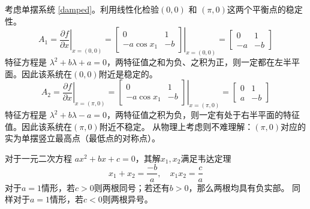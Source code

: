   \begin{example}[通过平衡点附近的线性化判别单摆系统的稳定性]\label{linearization_exp}
   考虑单摆系统 \eqref{damped}。利用线性化检验$(0, 0)$ 和 $(\pi, 0)$这两个平衡点的稳定性。
    \[ A_1 = \left. \frac{\partial f}{\partial x} \right|_{x = (0, 0)} = \left.
       \left[\begin{array}{cc}
         0 & 1\\
         -a\ensuremath{\operatorname{cos}}  x_1 & - b
       \end{array}\right] \right|_{x = (0, 0)} = \left[\begin{array}{cc}
         0 & 1\\
         - a & - b
       \end{array}\right] \]
    特征方程是 $\lambda^2 + b \lambda + a = 0$，两特征值之和为负、之积为正，则一定都在左半平面。因此该系统在$(0, 0)$附近是稳定的。
    \[ A_2 = \left. \frac{\partial f}{\partial x} \right|_{x = (\pi, 0)} =
       \left. \left[\begin{array}{cc}
         0 & 1\\
         -a\ensuremath{\operatorname{cos}}  x_1 & - b
       \end{array}\right] \right|_{x = (\pi, 0)} = \left[\begin{array}{cc}
         0 & 1\\
         a & - b
       \end{array}\right] \]
       特征方程是 $\lambda^2 + b \lambda - a = 0$，两特征值之积为负，则一定有处于右半平面的特征值。因此该系统在$(\pi, 0)$附近不稳定。
      从物理上考虑则不难理解：$(\pi, 0)$对应的实为单摆竖立最高点（最低点的对称点）。
    \begin{note}
      对于一元二次方程 $a  x^2 + b  x + c = 0$，其解$x_{1},x_{2}$满足韦达定理
      \[ x_1 + x_2 = \frac{- b}{a}, \quad x_1  x_2 = \frac{c}{a} \]
      对于$a = 1$情形，若$c > 0$则两根同号；若还有$b>0$，那么两根均具有负实部。
      同样对于$a = 1$情形，若$c < 0$则两根异号。
    \end{note}
  \end{example}